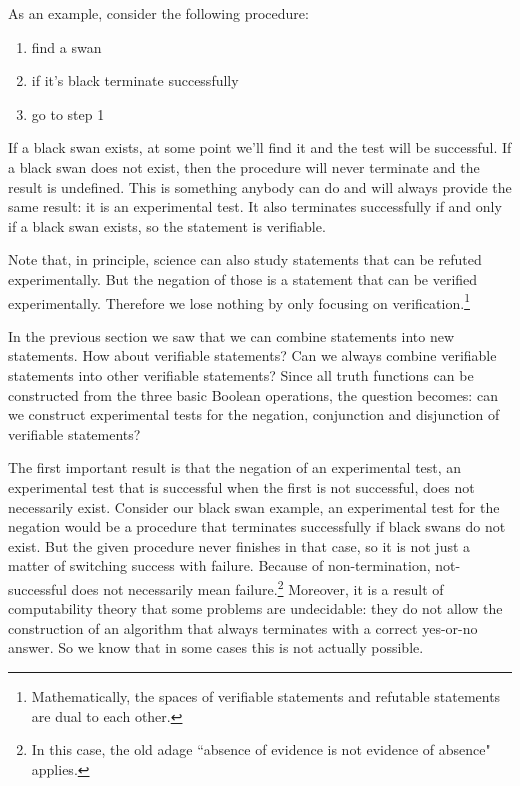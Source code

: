 \documentclass[11pt,letterpaper,fleqn]{memoir} %
\begin{document}
As an example, consider the following procedure:
\begin{enumerate}
	\item find a swan
	\item if it's black terminate successfully
	\item go to step 1
\end{enumerate}
If a black swan exists, at some point we'll find it and the test will be successful. If a black swan does not exist, then the procedure will never terminate and the result is undefined. This is something anybody can do and will always provide the same result: it is an experimental test. It also terminates successfully if and only if a black swan exists, so the statement  is verifiable.

Note that, in principle, science can also study statements that can be refuted experimentally. But the negation of those is a statement that can be verified experimentally. Therefore we lose nothing by only focusing on verification.\footnote{Mathematically, the spaces of verifiable statements and refutable statements are dual to each other.}

In the previous section we saw that we can combine statements into new statements. How about verifiable statements? Can we always combine verifiable statements into other verifiable statements? Since all truth functions can be constructed from the three basic Boolean operations, the question becomes: can we construct experimental tests for the negation, conjunction and disjunction of verifiable statements?

The first important result is that the negation of an experimental test, an experimental test that is successful when the first is not successful, does not necessarily exist. Consider our black swan example, an experimental test for the negation would be a procedure that terminates successfully if black swans do not exist. But the given procedure never finishes in that case, so it is not just a matter of switching success with failure. Because of non-termination, not-successful does not necessarily mean failure.\footnote{In this case, the old adage ``absence of evidence is not evidence of absence" applies.} Moreover, it is a result of computability theory that some problems are undecidable: they do not allow the construction of an algorithm that always terminates with a correct yes-or-no answer. So we know that in some cases this is not actually possible.
\end{document}
